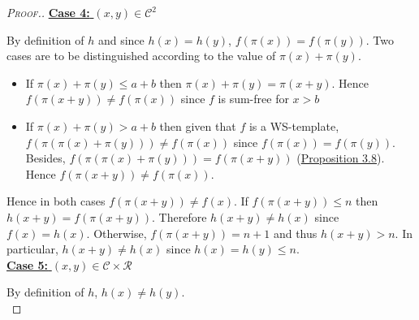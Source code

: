 \begin{proof}[\textsc{Proof.}]
\noindent \underline{\textbf{Case 4:} \((x,y) \in \mathcal{C}^2\)}
\par
By definition of \(h\) and since \(h(x)=h(y)\), \(f(\pi(x)) = f(\pi(y))\). Two cases are to be distinguished according
to the value of \(\pi(x)+\pi(y)\).
\begin{itemize}
\item If \(\pi(x) + \pi(y) \leqslant a+b\) then \(\pi(x)+\pi(y) = \pi(x + y)\). Hence \(f(\pi(x + y)) \neq f(\pi(x))\) since
	\(f\) is sum-free for \(x>b\)
\item \begin{sloppypar}
	If \(\pi(x)+\pi(y)>a+b\) then given that \(f\) is a WS-template, \({f(\pi(\pi(x)+\pi(y))) \neq f(\pi(x))}\) since
	\({f(\pi(x)) = f(\pi(y))}\). Besides,  \({f(\pi(\pi(x)+\pi(y))) = f(\pi(x + y))}\) (\hyperref[prop4]{Proposition 3.8}). Hence \({f(\pi(x + y))
	\neq  f(\pi(x))}\).
	\end{sloppypar}
\end{itemize}
\par
Hence in both cases \(f(\pi(x+y)) \neq f(x)\). If  \(f(\pi(x+y)) \leqslant n\) then \(h(x+y) = f(\pi(x+y))\). Therefore
\(h(x+y) \neq h(x)\) since \(f(x) = h(x)\). Otherwise, \(f(\pi(x+y)) = n + 1\) and thus \(h(x+y) > n\). In particular,
\(h(x + y) \neq h(x)\) since \(h(x) = h(y) \leqslant n\). \\

\noindent \underline{\textbf{Case 5:} \((x,y) \in \mathcal{C} \times \mathcal{R}\)}
\par
By definition of \(h\), \(h(x) \neq h(y)\).\\


\end{proof}
